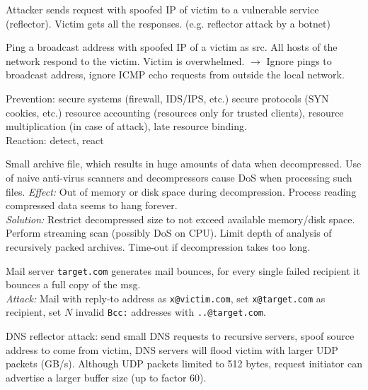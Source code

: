  Attacker sends request with spoofed IP of victim to a vulnerable service (reflector). Victim gets all the responses. (e.g. reflector attack by a botnet) 

 Ping a broadcast address with spoofed IP of a victim as src. All hosts of the network respond to the victim. Victim is overwhelmed. $\to$ Ignore pings to broadcast address, ignore ICMP echo requests from outside the local network.

 Prevention: secure systems (firewall, IDS/IPS, etc.) secure protocols (SYN cookies, etc.) resource accounting (resources only for trusted clients), resource multiplication (in case of attack), late resource binding.\\
Reaction: detect, react

 Small archive file, which results in huge amounts of data when decompressed. Use of naive anti-virus scanners and decompressors cause DoS when processing such files. \textit{Effect:} Out of memory or disk space during decompression. Process reading compressed data seems to hang forever.\\
\textit{Solution:} Restrict decompressed size to not exceed available memory/disk space. Perform streaming scan (possibly DoS on CPU). Limit depth of analysis of recursively packed archives. Time-out if decompression takes too long.

 Mail server {\tt target.com} generates mail bounces, for every single failed recipient it bounces a full copy of the msg.\\
\textit{Attack:} Mail with reply-to address as {\tt x@victim.com}, set {\tt x@target.com} as recipient, set $N$ invalid {\tt Bcc:} addresses with {\tt ..@target.com}.

 DNS reflector attack: send small DNS requests to recursive servers, spoof source address to come from victim, DNS servers will flood victim with larger UDP packets (GB/s). Although UDP packets limited to 512 bytes, request initiator can advertise a larger buffer size (up to factor 60).